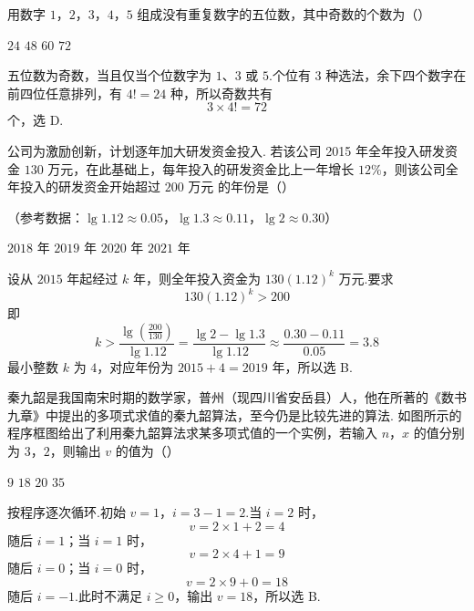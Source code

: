 \begin{problem}
用数字 \(1\)，\(2\)，\(3\)，\(4\)，\(5\) 组成没有重复数字的五位数，其中奇数的个数为（\quad）

\choices
    {\(24\)}
    {\(48\)}
    {\(60\)}
    {\(72\)}

\begin{solution}
五位数为奇数，当且仅当个位数字为 \(1\)、\(3\) 或 \(5\).个位有 \(3\) 种选法，余下四个数字在前四位任意排列，有 \(4!=24\) 种，所以奇数共有
\[
3\times4!=72
\]
个，选 D.
\end{solution}
\end{problem}



\begin{problem}
公司为激励创新，计划逐年加大研发资金投入. 若该公司 2015 年全年投入研发资金 \(130\text{ 万元}\)，在此基础上，每年投入的研发资金比上一年增长 \(12\%\)，则该公司全年投入的研发资金开始超过 \(200\text{ 万元}\) 的年份是（\quad）

（参考数据：\(\lg 1.12\approx0.05\)，\(\lg 1.3\approx0.11\)，\(\lg 2\approx0.30\)）

\choices
    {\(2018\) 年}
    {\(2019\) 年}
    {\(2020\) 年}
    {\(2021\) 年}

\begin{solution}
设从 \(2015\) 年起经过 \(k\) 年，则全年投入资金为 \(130(1.12)^k\) 万元.要求
\[
130(1.12)^k>200
\]
即
\[
k>\frac{\lg(\frac{200}{130})}{\lg1.12}=\frac{\lg2-\lg1.3}{\lg1.12}\approx\frac{0.30-0.11}{0.05}=3.8
\]
最小整数 \(k\) 为 \(4\)，对应年份为 \(2015+4=2019\) 年，所以选 B.
\end{solution}
\end{problem}



\begin{problem}
秦九韶是我国南宋时期的数学家，普州（现四川省安岳县）人，他在所著的《数书九章》中提出的多项式求值的秦九韶算法，至今仍是比较先进的算法. 如图所示的程序框图给出了利用秦九韶算法求某多项式值的一个实例，若输入 \(n\)，\(x\) 的值分别为 \(3\)，\(2\)，则输出 \(v\) 的值为（\quad）


\choices
    {\(9\)}
    {\(18\)}
    {\(20\)}
    {\(35\)}

\begin{solution}
按程序逐次循环.初始 \(v=1\)，\(i=3-1=2\).当 \(i=2\) 时，
\[
v=2\times1+2=4
\]
随后 \(i=1\)；当 \(i=1\) 时，
\[
v=2\times4+1=9
\]
随后 \(i=0\)；当 \(i=0\) 时，
\[
v=2\times9+0=18
\]
随后 \(i=-1\).此时不满足 \(i\geq0\)，输出 \(v=18\)，所以选 B.
\end{solution}
\end{problem}



